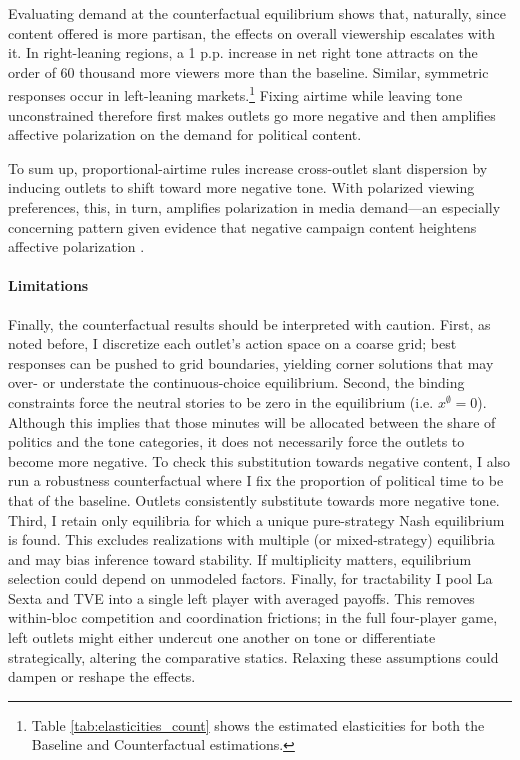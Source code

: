 \documentclass[12pt]{article}
\begin{document}
Evaluating demand at the counterfactual equilibrium shows that, naturally, since content offered is more partisan, the effects on overall viewership escalates with it.  In right-leaning regions, a 1 p.p. increase in net right tone attracts on the order of 60 thousand more viewers more than the baseline. Similar, symmetric responses occur in  left-leaning markets.\footnote{Table \ref{tab:elasticities_count} shows the estimated elasticities for both the Baseline and Counterfactual estimations. } Fixing airtime while leaving tone unconstrained therefore first makes outlets go more negative and then amplifies affective polarization on the demand for political content. 

To sum up, proportional-airtime rules increase cross-outlet slant dispersion by inducing outlets to shift toward more negative tone. With polarized viewing preferences, this, in turn, amplifies polarization in media demand—an especially concerning pattern given evidence that negative campaign content heightens affective polarization \citep{lau2017effect}.





\paragraph{Limitations} Finally, the counterfactual results should be interpreted with caution. First, as noted before, I discretize each outlet’s action space on a coarse grid; best responses can be pushed to grid boundaries, yielding corner solutions that may over- or understate the continuous-choice equilibrium. Second, the binding constraints force the neutral stories to be zero in the equilibrium (i.e. $x^\emptyset=0$). Although this implies that those minutes will be allocated between the share of politics and the tone categories, it does not necessarily force the outlets to become more negative. To check this substitution towards negative content, I also run a robustness counterfactual where I fix the proportion of political time to be that of the baseline. Outlets consistently substitute towards more negative tone. Third, I retain only equilibria for which a unique pure-strategy Nash equilibrium is found. This excludes realizations with multiple (or mixed-strategy) equilibria and may bias inference toward stability. If multiplicity matters, equilibrium selection could depend on unmodeled factors. Finally, for tractability I pool La Sexta and TVE into a single left player with averaged payoffs. This removes within-bloc competition and coordination frictions; in the full four-player game, left outlets might either undercut one another on tone or differentiate strategically, altering the comparative statics. Relaxing these assumptions could dampen or reshape the effects.
\end{document}
